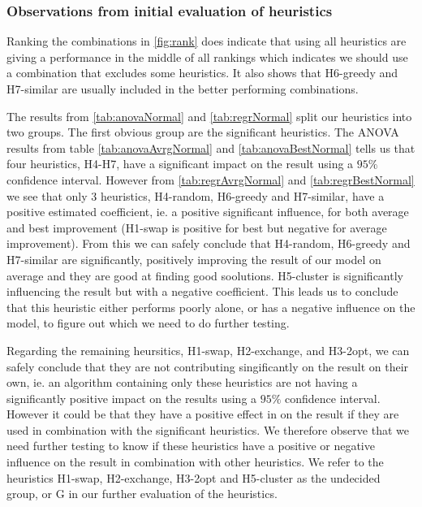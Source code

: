 \documentclass[../main.tex]{subfiles}
\begin{document}
\subsubsection{Observations from initial evaluation of heuristics}
Ranking the combinations in \cref{fig:rank} does indicate that using all heuristics are giving a performance in the middle of all rankings which indicates we should use a combination that excludes some heuristics. 
It also shows that H6-greedy and H7-similar are usually included in the better performing combinations. \par 
The results from \cref{tab:anovaNormal} and \cref{tab:regrNormal} split our heuristics into two groups. 
The first obvious group are the significant heuristics.
The ANOVA results from table \cref{tab:anovaAvrgNormal} and \cref{tab:anovaBestNormal} tells us that four heuristics, H4-H7, have a significant impact on the result using a $95\%$ confidence interval.
However from \cref{tab:regrAvrgNormal} and \cref{tab:regrBestNormal} we see that only 3 heuristics, H4-random, H6-greedy and H7-similar, have a positive estimated coefficient, ie. a positive significant influence, for both average and best improvement (H1-swap is positive for best but negative for average improvement).
From this we can safely conclude that H4-random, H6-greedy and H7-similar are significantly, positively improving the result of our model on average and they are good at finding good soolutions. 
H5-cluster is significantly influencing the result but with a negative coefficient. 
This leads us to conclude that this heuristic either performs poorly alone, or has a negative influence on the model, to figure out which we need to do further testing.
\par
Regarding the remaining heursitics, H1-swap, H2-exchange, and H3-2opt, we can safely conclude that they are not contributing singificantly on the result on their own, ie. an algorithm containing only these heuristics are not having a significantly positive impact on the results using a $95\%$ confidence interval.
However it could be that they have a positive effect in on the result if they are used in combination with the significant heuristics.
We therefore observe that we need further testing to know if these heuristics have a positive or negative influence on the result in combination with other heuristics.
We refer to the heuristics H1-swap, H2-exchange, H3-2opt and H5-cluster as the undecided group, or G in our further evaluation of the heuristics.
\end{document}
